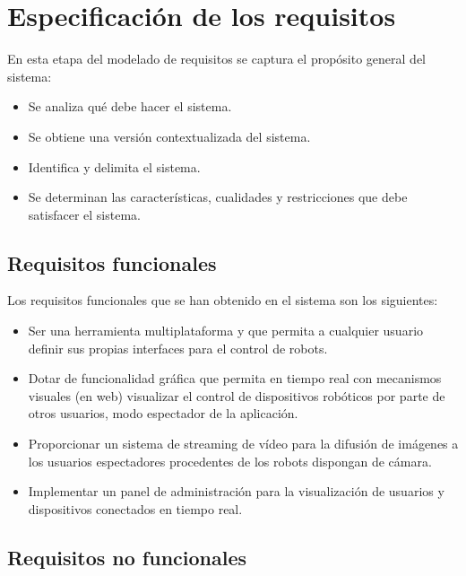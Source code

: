 \section[Especificación]{Especificación de los requisitos}

En esta etapa del modelado de requisitos se captura el propósito general del sistema:

\begin{itemize}
\item Se analiza qué debe hacer el sistema.
\item Se obtiene una versión contextualizada del sistema.
\item Identifica y delimita el sistema.
\item Se determinan las características, cualidades y restricciones que debe satisfacer el sistema.
\end{itemize}

\subsection{Requisitos funcionales}

Los requisitos funcionales que se han obtenido en el sistema son los siguientes:

\begin{itemize}
\item Ser una herramienta multiplataforma y que permita a cualquier usuario definir sus propias interfaces para el control de robots.
\item Dotar de funcionalidad gráfica que permita en tiempo real con mecanismos visuales (en web) visualizar el control de dispositivos robóticos por parte de otros usuarios, modo espectador de la aplicación.
\item Proporcionar un sistema de streaming de vídeo para la difusión de imágenes a los usuarios espectadores procedentes de los robots dispongan de cámara.
\item Implementar un panel de administración para la visualización de usuarios y dispositivos conectados en tiempo real.
\end{itemize}

\subsection{Requisitos no funcionales}

